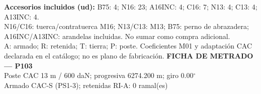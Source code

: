 \begingroup\scriptsize
\textbf{Accesorios incluidos (ud):} B75: 4; N16: 23; A16INC: 4; C16: 7; N13: 4; C13: 4; A13INC: 4.\\
N16/C16: tuerca/contratuerca M16; N13/C13: M13; B75: perno de abrazadera; A16INC/A13INC: arandelas incluidas. No sumar como compra adicional.\\
A: armado; R: retenida; T: tierra; P: poste. Coeficientes M01 y adaptación CAC declarada en el catálogo; no es plano de fabricación.
\endgroup\endgroup
\clearpage{}
\begingroup\small\setlength{\parskip}{3pt}\renewcommand{\arraystretch}{1.05}
\textbf{\large FICHA DE METRADO — P103}\\[4pt]
Poste CAC 13 m / 600 daN; progresiva 6274.200 m; giro 0.00\ensuremath{^\circ}\\
Armado CAC-S (PS1-3); retenidas RI-A: 0 ramal(es)\\
\begingroup\scriptsize
